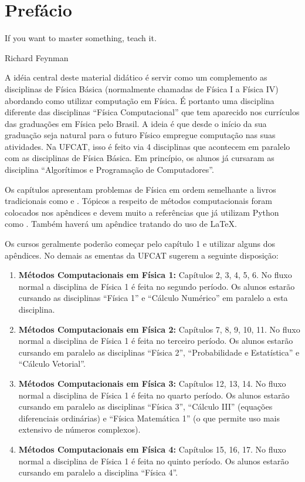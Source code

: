 	\chapter{Prefácio}
\epigraph{If you want to master something, teach it.}{Richard Feynman}
	
	A idéia central deste material didático é servir como um complemento as disciplinas de Física Básica (normalmente chamadas de Física I a Física IV) abordando como utilizar computação em Física. É portanto uma disciplina diferente das disciplinas ``Física Computacional'' que tem aparecido nos currículos das graduações em Física pelo Brasil. A ideia é que desde o início da sua graduação seja natural para o futuro Físico empregue computação nas suas atividades. Na UFCAT, isso é feito via 4 disciplinas que acontecem em paralelo com as disciplinas de Física Básica. Em princípio, os alunos já cursaram as disciplina ``Algorítimos e Programação de Computadores''.
	
	Os capítulos apresentam problemas de Física em ordem semelhante a livros tradicionais como \cite{halliday2002fundamentals} e \cite{nussenzveig2013curso, nussenzveig2014curso, nussenzveig2015curso, nussenzveig2018curso}. Tópicos a respeito de métodos computacionais foram colocados nos apêndices e devem muito a referências que já utilizam Python como \cite{ayars2013computational, hill2020learning}. Também haverá um apêndice tratando do uso de \LaTeX.
	
	Os cursos geralmente poderão começar pelo capítulo 1 e utilizar alguns dos apêndices. No demais as ementas da UFCAT sugerem a seguinte disposição:
	\begin{enumerate}
	    \item  {\bf Métodos Computacionais em Física 1:}  Capítulos 2, 3, 4, 5, 6. 
	    No fluxo normal a disciplina de Física 1 é feita no segundo período. Os alunos estarão cursando as disciplinas ``Física 1'' e ``Cálculo Numérico'' em paralelo a esta disciplina.
	    \item {\bf Métodos Computacionais em Física 2:} Capítulos 7, 8, 9, 10, 11. No fluxo normal a disciplina de Física 1 é feita no terceiro período. Os alunos estarão cursando em paralelo as disciplinas ``Física 2'', ``Probabilidade e Estatística'' e ``Cálculo Vetorial''.
	    \item {\bf Métodos Computacionais em Física 3:} Capítulos 12, 13, 14. No fluxo normal a disciplina de Física 1 é feita no quarto período. Os alunos estarão cursando em paralelo as disciplinas ``Física 3'', ``Cálculo III'' (equações diferenciais ordinárias) e ``Física Matemática 1'' (o que permite uso mais extensivo de números complexos).
	    \item {\bf Métodos Computacionais em Física 4:} Capítulos 15, 16, 17. No fluxo normal a disciplina de Física 1 é feita no quinto período. Os alunos estarão cursando em paralelo a disciplina ``Física 4''.
	\end{enumerate}
	
